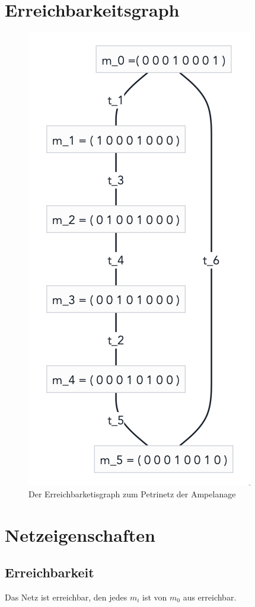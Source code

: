 \documentclass{article}
\begin{document}
	\section{Erreichbarkeitsgraph}
		\begin{figure}[h]
			\includegraphics[scale=0.525, center]{Erreichbarkeitsgraph.png}
			\caption{Der Erreichbarketisgraph zum Petrinetz der Ampelanage}
			\label{fig_2: Erreichbarkeitsgraph}
		\end{figure}
	\section{Netzeigenschaften}
		\subsection*{Erreichbarkeit}
			Das Netz ist erreichbar, den jedes $m_i$ ist von $m_0$ aus erreichbar.
\end{document}
